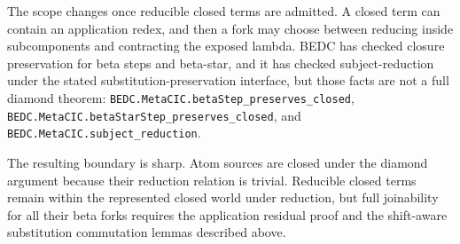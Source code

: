 The scope changes once reducible closed terms are admitted. A closed term can
contain an application redex, and then a fork may choose between reducing
inside subcomponents and contracting the exposed lambda. BEDC has checked
closure preservation for beta steps and beta-star, and it has checked
subject-reduction under the stated substitution-preservation interface, but
those facts are not a full diamond theorem:
\texttt{BEDC.MetaCIC.betaStep\_preserves\_closed},
\texttt{BEDC.MetaCIC.betaStarStep\_preserves\_closed}, and
\texttt{BEDC.MetaCIC.subject\_reduction}.

The resulting boundary is sharp. Atom sources are closed under the diamond
argument because their reduction relation is trivial. Reducible closed terms
remain within the represented closed world under reduction, but full
joinability for all their beta forks requires the application residual proof
and the shift-aware substitution commutation lemmas described above.
